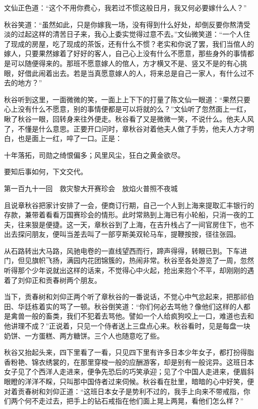 \documentclass[12pt,UTF8]{ctexbook}
\begin{document}
{{{文仙正色道：“这个不用你费心，我若过不惯这般日月，我又何必要嫁什么人？”

秋谷笑道：“虽然如此，只是你嫁我一场，没有得到什么好处，却倒反要你熬清受淡的过起这样的清苦日子来，我心上委实觉得过意不去。”文仙微笑道：“一个人住了现成的房屋，吃了现成的茶饭，还有什么不惯？老实和你说了罢，我们当倌人的嫁人，只要果然嫁着了好好的客人，自己心上没有什么不愿意，那些身外的事情都是可以随便得来的。那班不愿意嫁人的倌人，方才横又不是、竖又不是的有心挑眼，好借此闹着出去。若是当真愿意嫁人的人，将来总是自己一家人，有什么过不去的地方？”

秋谷听到这里，一面微微的笑，一面上上下下的打量了陈文仙一眼道：“果然只要心上没有什么不愿意，别的事情便都是可以将就的么？”文仙听了忽然面上一红，瞅了秋谷一眼，回转身来往外便走。秋谷看了又是微微一笑，不说什么。他夫人风了，不懂是什么意思。正要开口问时，章秋谷对着他夫人做了手势，他夫人方才明白，也是面上一红，啐了一口。正是：

十年落拓，司勋之绮恨偏多；风里风尘，狂白之黄金欲尽。

要知后事如何，下文交代。





第一百九十一回　救灾黎大开赛珍会　放焰火普照不夜城





且说章秋谷把家计安排了一会，便商订行期，自己一个人到上海来提取汇丰银行的存款，兼带着看看万国赛珍会的情形。此时常熟到上海已有小轮船，只消一夜的工夫，往来狠是便捷。这一天，章秋谷到了上海，在吉升栈占了一间官房住下，也不出去探问朋友，便叫当差去叫了一部亨斯美双轮马车，提鞭按按，径往张园。

从石路转出大马路，风驰电卷的一直线望西而行，蹄声得得，转眼已到。下车进门，但见旗帜飞扬，满园内花团锦簇的，热闹非常。秋谷至各处游览了一周，忽然听得那个少年说就出这样的话来，不觉得心中火起，抢出来抱个不平，却刚刚的遇着了刘仰正和贡春树两个朋友。

当下，贡春树和刘仰正两个听了章秋谷的一番说话，不觉心中气忿起来，把那祁伯田、华廷栋着实的骂了一顿。秋谷倒笑道：“你们何必去骂他？像他们这样的人都是禽兽一般的畜类，我们不犯着去骂他。譬如一个人给疯狗咬上一口，难道也去和他讲理不成？”正说着，只见一个侍者送上三盘点心来。秋谷看时，见是每盘一块奶饼、一方蛋糕、两方糖饼。三个人也随意吃了些。

秋谷又抬起头来，四下里看了一看，只见四下里有许多日本少年女子，都打扮得脂香粉艳、锦衣绣裳的，在那里穿梭一般的应酬游客，却是别有一般诧异。这班日本女子见了个西洋人走进来，便争先恐后的巧笑承迎；见了个中国人走进来，便眉斜眼瞪的洋洋不睬，只叫那中国侍者过来伺候。秋谷看在肚里，暗暗的心中好笑，便对着贡春树和刘仰正道：“这班日本女子是势利不过的，我手上向来不带戒指，你们两个何不走过去，把手上的钻石戒指在他们面上晃上两晃，看他们怎么样？”

}}}
\end{document}
